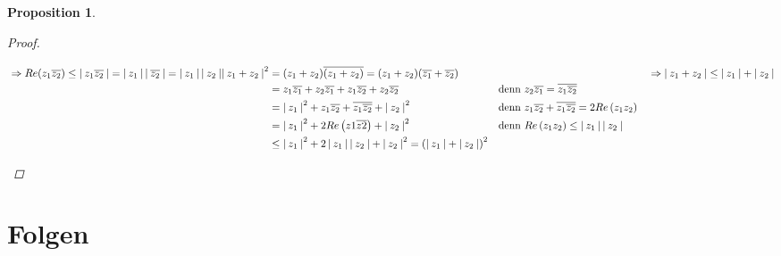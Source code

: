 \documentclass[a4paper,titlepage,oneside]{article}
\newcommand{\abs}[1]{\ensuremath{\left|\:#1\:\right|}}
\theoremstyle{thmstyle}
\newtheorem{prop}[satz]{Proposition}
\theoremstyle{subthmstyle}
\begin{document}
\begin{prop}
\begin{proof}
\begin{enumerate}[label=(\roman*)]
\begin{math}
\begin{aligned}[t]
&\Rightarrow Re(z_1\overline{z_2}) \le \abs{z_1\overline{z_2}} = \abs{z_1}\abs{\overline{z_2}} = \abs{z_1}\abs{z_2} \\
\end{aligned}\\
\begin{aligned}[t]
\abs{z_1 + z_2}^2 &= (z_1 + z_2)\overline{(z_1 + z_2)} = (z_1 + z_2)(\overline{z_1} + \overline{z_2}) \\
&= z_1\overline{z_1} + z_2\overline{z_1} + z_1\overline{z_2} + z_2\overline{z_2} &&\text{denn } z_2\overline{z_1} = \overline{z_1\overline{z_2}} \\
&= \abs{z_1}^2 + z_1\overline{z_2} + \overline{z_1\overline{z_2}} + \abs{z_2}^2 &&\text{denn } z_1\overline{z_2} + \overline{z_1\overline{z_2}} = 2Re\left(z_1z_2\right) \\
&= \abs{z_1}^2 + 2 Re\left(z1 \overline{z2}\right) + \abs{z_2}^2 &&\text{denn } Re\left(z_1z_2\right) \le \abs{z_1}\abs{z_2}\\
&\le  \abs{z_1}^2 + 2\abs{z_1}\abs{z_2} + \abs{z_2}^2 = \left(\abs{z_1} + \abs{z_2}\right)^2
\end{aligned}\\
\Rightarrow \abs{z_1 + z_2} \le \abs{z_1} + \abs{z_2}
\end{math}
\end{enumerate}
\end{proof}
\end{prop}


\section{Folgen}
\end{document}
